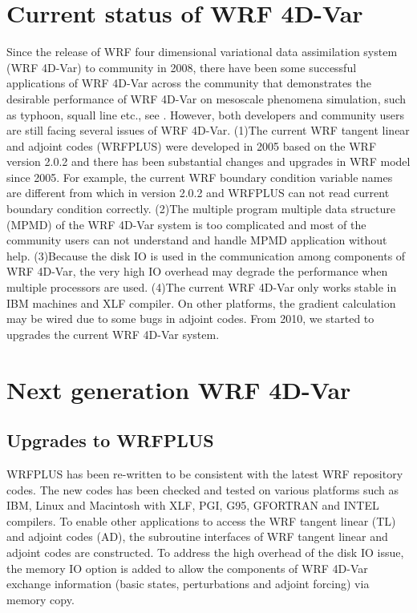 \documentclass[12pt]{article}
\begin{document}
\section{Current status of WRF 4D-Var}

Since the release of WRF four dimensional variational data assimilation system (WRF 4D-Var) to community in 2008, there have been some successful applications of WRF 4D-Var across the community that demonstrates the desirable performance of WRF 4D-Var on mesoscale phenomena simulation, such as typhoon, squall line etc., see \cite{Huang2009}. However, both developers and community users are still facing several issues of WRF 4D-Var. (1)The current WRF tangent linear and adjoint codes (WRFPLUS) were developed in 2005 based on the WRF version 2.0.2 and there has been substantial changes and upgrades in WRF model since 2005. For example, the current WRF boundary condition variable names are different from which in version 2.0.2 and WRFPLUS can not read current boundary condition correctly. (2)The multiple program multiple data structure (MPMD) of the WRF 4D-Var system is too complicated and most of the community users can not understand and handle MPMD application without help. (3)Because the disk IO is used in the communication among components of WRF 4D-Var, the very high IO overhead may degrade the performance when multiple processors are used. (4)The current WRF 4D-Var only works stable in IBM machines and XLF compiler. On other platforms, the gradient calculation may be wired due to some bugs in adjoint codes. From 2010, we started to upgrades the current WRF 4D-Var system.

\section{Next generation WRF 4D-Var}

\subsection{Upgrades to WRFPLUS}

WRFPLUS has been re-written to be consistent with the latest WRF repository codes. The new codes has been checked and tested on various platforms such as IBM, Linux and Macintosh with XLF, PGI, G95, GFORTRAN and INTEL compilers. To enable other applications to access the WRF tangent linear (TL) and adjoint codes (AD), the subroutine interfaces of WRF tangent linear and adjoint codes are constructed. To address the high overhead of the disk IO issue, the memory IO option is added to allow the components of WRF 4D-Var exchange information (basic states, perturbations and adjoint forcing) via memory copy.
\end{document}
